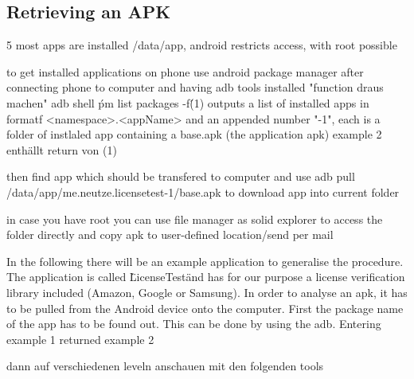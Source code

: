 \subsection{Retrieving an APK} \label{subsection:tools-apk}
5
most apps are installed /data/app, android restricts access, with root possible

to get installed applications on phone use android package manager
after connecting phone to computer and having \gls{adb} tools installed
"function draus machen" adb shell \'pm list packages -f\' (1)
outputs a list of installed apps in formatf <namespace>.<appName> and an appended number "-1", each is a folder of instlaled app containing a base.apk (the application apk)
example 2 enthällt return von (1)

then find app which should be transfered to computer and use
adb pull /data/app/me.neutze.licensetest-1/base.apk
to download app into current folder

in case you have root you can use file manager as solid explorer to access the folder directly and copy apk to user-defined location/send per mail


\cite{munteanLicense}
%

In the following there will be an example application to generalise the procedure. The application is called \"LicenseTest\" and has for our purpose a license verification library included (Amazon, Google or Samsung).\newline
In order to analyse an \gls{apk}, it has to be pulled from the Android device onto the computer. First the package name of the app has to be found out. This can be done by using the \gls{adb}. Entering example 1 returned example 2

dann auf verschiedenen leveln anschauen mit den folgenden tools
